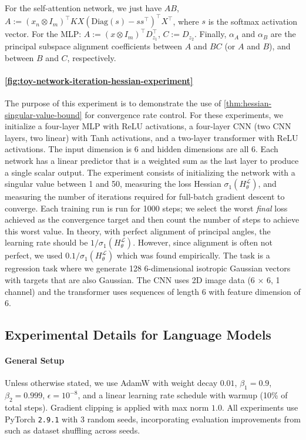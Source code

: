 \documentclass{article}
\theoremstyle{plain}
\theoremstyle{definition}
\theoremstyle{remark}
\begin{document}
For the self-attention network, we just have $AB$, $A := (x_n \otimes I_m)^{\top} K X (\mathrm{Diag}(s) - ss^{\top})^{\top}X^{\top}$, where $s$ is the softmax activation vector. For the MLP: $A := (x \otimes I_m)^{\top} D_{z_1}^{ \top}$, $C := D_{z_2}$. Finally, $\alpha_A$ and $\alpha_B$ are the principal subspace alignment coefficients between $A$ and $BC$ (or $A$ and $B$), and between $B$ and $C$, respectively.

\paragraph{\cref{fig:toy-network-iteration-hessian-experiment}} The purpose of this experiment is to demonstrate the use of \cref{thm:hessian-singular-value-bound} for convergence rate control. For these experiments, we initialize a four-layer MLP with ReLU activations, a four-layer CNN (two CNN layers, two linear) with Tanh activations, and a two-layer transformer with ReLU activations. The input dimension is 6 and hidden dimensions are all 6. Each network has a linear predictor that is a weighted sum as the last layer to produce a single scalar output. The experiment consists of initializing the network with a singular value between 1 and 50, measuring the loss Hessian $\sigma_1(H_{\theta}^{\mathcal{L}})$, and measuring the number of iterations required for full-batch gradient descent to converge. Each training run is run for 1000 steps; we select the worst \textit{final} loss achieved as the convergence target and then count the number of steps to achieve this worst value. In theory, with perfect alignment of principal angles, the learning rate should be $1/\sigma_1(H_{\theta}^{\mathcal{L}})$. However, since alignment is often not perfect, we used $0.1/\sigma_1(H_{\theta}^{\mathcal{L}})$ which was found empirically. The task is a regression task where we generate 128 6-dimensional isotropic Gaussian vectors with targets that are also Gaussian. The CNN uses 2D image data (6 $\times$ 6, 1 channel) and the transformer uses sequences of length 6 with feature dimension of 6.

\subsection{Experimental Details for Language Models}

\paragraph{General Setup} Unless otherwise stated, we use AdamW \citep{loshchilov2017decoupled} with weight decay $0.01$, $\beta_1=0.9$, $\beta_2=0.999$, $\epsilon=10^{-8}$, and a linear learning rate schedule with warmup (10\% of total steps). Gradient clipping is applied with max norm $1.0$. All experiments use PyTorch \texttt{2.9.1} with 3 random seeds, incorporating evaluation improvements from \citet{qi2024evaluating} such as dataset shuffling across seeds.
\end{document}
